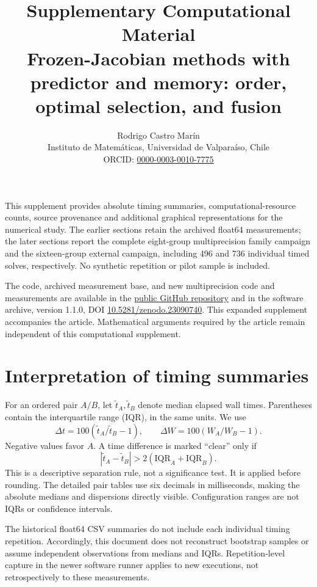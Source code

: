 \documentclass[11pt]{article}
\title{\textbf{Supplementary Computational Material}\\[3pt]\large Frozen-Jacobian methods with predictor and memory: order, optimal selection, and fusion}
\author{Rodrigo Castro Marín\\\small Instituto de Matemáticas, Universidad de Valparaíso, Chile\\\small ORCID: \href{https://orcid.org/0000-0003-0010-7775}{0000-0003-0010-7775}}
\date{}
\begin{document}
\maketitle
This supplement provides absolute timing summaries, computational-resource counts, source provenance and additional graphical representations for the numerical study. The earlier sections retain the archived float64 measurements; the later sections report the complete eight-group multiprecision family campaign and the sixteen-group external campaign, including 496 and 736 individual timed solves, respectively. No synthetic repetition or pilot sample is included.

The code, archived measurement base, and new multiprecision code and measurements are available in the \href{https://github.com/rocacastro/pn-frozen-jacobian}{public GitHub repository} and in the software archive, version 1.1.0, DOI \href{https://doi.org/10.5281/zenodo.23090740}{10.5281/zenodo.23090740}. This expanded supplement accompanies the article. Mathematical arguments required by the article remain independent of this computational supplement.

\section{Interpretation of timing summaries}
For an ordered pair $A/B$, let $\widetilde t_A,\widetilde t_B$ denote median elapsed wall times. Parentheses contain the interquartile range (IQR), in the same units. We use
\[
\Delta t=100(\widetilde t_A/\widetilde t_B-1),\qquad
\Delta W=100(W_A/W_B-1).
\]
Negative values favor $A$. A time difference is marked ``clear'' only if
\[
|\widetilde t_A-\widetilde t_B|>2(\mathrm{IQR}_A+\mathrm{IQR}_B).
\]
This is a descriptive separation rule, not a significance test. It is applied before rounding. The detailed pair tables use six decimals in milliseconds, making the absolute medians and dispersions directly visible. Configuration ranges are not IQRs or confidence intervals.

The historical float64 CSV summaries do not include each individual timing repetition. Accordingly, this document does not reconstruct bootstrap samples or assume independent observations from medians and IQRs. Repetition-level capture in the newer software runner applies to new executions, not retrospectively to these measurements.


\FloatBarrier
\end{document}
